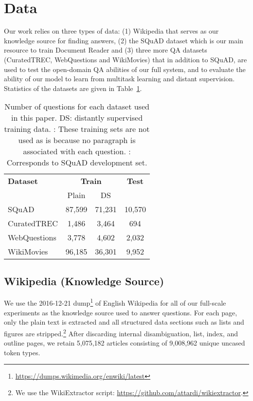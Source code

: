 \documentclass[11pt,a4paper]{article}
\newcommand\squad{SQuAD\xspace}
\newcommand\lcurq{CuratedTREC\xspace}
\newcommand\wikim{WikiMovies\xspace}
\newcommand\wq{WebQuestions\xspace}
\newcommand\usp{Document Reader\xspace}
\begin{document}
\section{Data} \label{sec:data}

Our work relies on three types of data: (1) Wikipedia that serves as our knowledge source for finding answers, (2) the SQuAD dataset which is our main resource to train \usp and (3) three more QA datasets (CuratedTREC, WebQuestions and WikiMovies)  that in addition to SQuAD, are used to test the open-domain QA abilities of our full system, and to evaluate the ability of our model to learn from multitask learning and distant supervision.
Statistics of the datasets are given in Table~\ref{tab:data-stats}.

\begin{table}[h]
\begin{center}
\begin{tabular}{l|c@{\,\,}c@{\,\,}c}
\hline
\bf Dataset & \multicolumn{2}{c}{\bf Train} & \bf Test  \\
& Plain & DS &  \\
\hline
\squad &  87,599 & 71,231 & 10,570 \\
\lcurq &  1,486 & 3,464 & 694 \\
\wq &  3,778 & 4,602 & 2,032 \\
\wikim &  96,185 & 36,301 & 9,952 \\
\hline
\end{tabular}
\end{center}
\caption{\label{tab:data-stats} Number of questions for each dataset used in this paper. DS: distantly supervised training data.
: These training sets are not used as is because no paragraph is associated with each question.
: Corresponds to SQuAD development set.}
\end{table}

\subsection{Wikipedia (Knowledge Source)}
We use the 2016-12-21 dump\footnote{\url{https://dumps.wikimedia.org/enwiki/latest}} of English Wikipedia for all of our full-scale experiments as the knowledge source used to answer questions. For each page, only the plain text is extracted and all structured data sections such as lists and figures are stripped.\footnote{We use the WikiExtractor script: \url{https://github.com/attardi/wikiextractor}.} After discarding internal disambiguation, list, index, and outline pages, we retain 5,075,182 articles consisting of 9,008,962 unique uncased token types.
\end{document}
